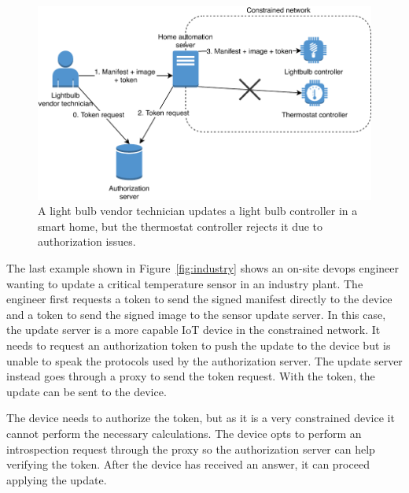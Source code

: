 \documentclass[0-thesis.tex]{subfiles}
\begin{document}
\begin{figure}
    \caption{A light bulb vendor technician updates a light bulb controller in a smart
                home, but the thermostat controller rejects it due to authorization
                issues.}
    \label{fig:smart-home}
    \includegraphics{images/use-case-smart-home.pdf}
\end{figure}

The last example shown in Figure~\ref{fig:industry} shows an on-site devops engineer
wanting to update a critical temperature sensor in an industry plant. The engineer first
requests a token to send the signed manifest directly to the device and a token to send
the signed image to the sensor update server. In this case, the update server is a more
capable IoT device in the constrained network. It needs to request an authorization token
to push the update to the device but is unable to speak the protocols used by the
authorization server. The update server instead goes through a proxy to send the token
request. With the token, the update can be sent to the device.

The device needs to authorize the token, but as it is a very constrained device it cannot
perform the necessary calculations. The device opts to perform an introspection request
through the proxy so the authorization server can help verifying the token. After the
device has received an answer, it can proceed applying the update.
\end{document}
